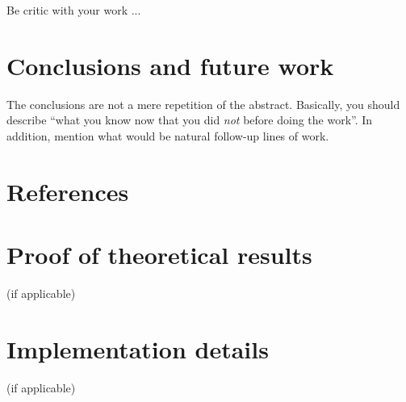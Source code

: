 \documentclass[anon]{CI}
\begin{document}
Be critic with your work ...

\section{Conclusions and future work}

The conclusions are not a mere repetition of the abstract. Basically, you should describe ``what you know now that you did \emph{not} before doing the work''. In addition, mention what would be natural follow-up lines of work.

\section*{References}




\appendix

\section{Proof of theoretical results} (if applicable)

\section{Implementation details} (if applicable)
\end{document}
